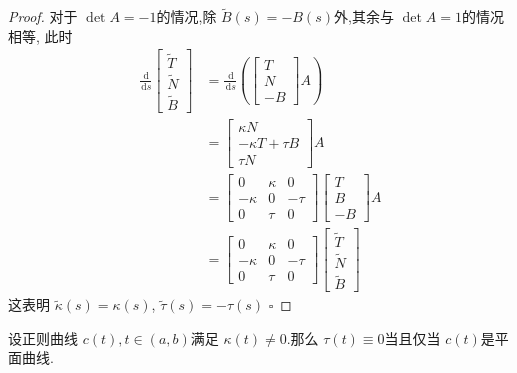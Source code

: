 \documentclass[../../古典微分几何.tex]{subfiles}
\begin{document}
\begin{itemize}
\begin{proof}
   对于 \(  \det A= -1  \)的情况,除 \(  \tilde{B}\left( s \right)= -B\left( s \right)    \)外,其余与 \(  \det A= 1  \)的情况相等,  此时 \[
   \begin{aligned}
   \frac{\,\mathrm{d}  }{\,\mathrm{d} s }\begin{bmatrix} 
       \tilde{T}\\ 
        \tilde{N}\\ 
         \tilde{B} 
   \end{bmatrix} & =  \frac{\,\mathrm{d}  }{\,\mathrm{d} s }\left( \begin{bmatrix} 
       T\\ 
        N\\ 
         -B 
   \end{bmatrix}A  \right)     \\ 
    & =  \begin{bmatrix} 
         \kappa N\\ 
          - \kappa  T+ \tau B\\ 
           \tau N 
    \end{bmatrix}A\\ 
     & =  \begin{bmatrix} 
         0&  \kappa &0\\ 
          - \kappa &0&-\tau \\ 
           0&\tau &0 
     \end{bmatrix} \begin{bmatrix} 
         T\\ 
          B\\ 
           -B 
     \end{bmatrix}A\\ 
      & =  \begin{bmatrix} 
           0 &  \kappa &0\\ 
            - \kappa &0&-\tau \\ 
             0&\tau &0
      \end{bmatrix} \begin{bmatrix} 
          \tilde{T}\\ 
           \tilde{N}\\ 
            \tilde{B} 
      \end{bmatrix}     
   \end{aligned}
   \]这表明 \(   \tilde{\kappa} \left( s \right)=  \kappa \left( s \right)    \), \(  \tilde{\tau} \left( s \right)= -\tau \left( s \right)    \)  
    \hfill $\square$
\end{proof}
    \begin{theorem}
        设正则曲线 \(  c\left( t \right)   , t \in \left( a,b \right) \)满足 \(   \kappa  \left( t \right)\neq 0   \).那么 \(  \tau \left( t \right)\equiv 0   \)当且仅当 \(  c\left( t \right)   \)是平面曲线.    
    \end{theorem}
    

\end{itemize}
\end{document}
